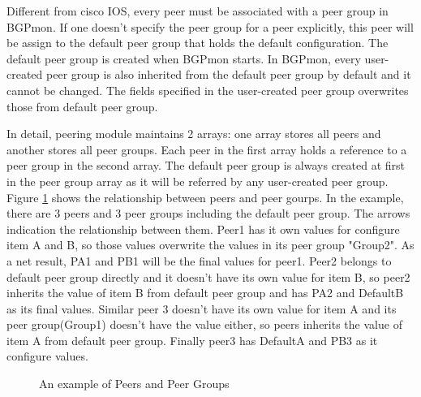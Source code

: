 Different from cisco IOS, every peer must be associated with a peer group in BGPmon. If one doesn't specify the peer group for a peer explicitly, this peer will be assign to the default peer group that holds the default configuration. The default peer group is created when BGPmon starts. In BGPmon, every user-created peer group is also inherited from the default peer group by default and it cannot be changed. The fields specified in the user-created peer group overwrites those from default peer group.

In detail, peering module maintains 2 arrays: one array stores all peers and another stores all peer groups. Each peer in the first array holds a reference to a peer group in the second array.  The default peer group is always created at first in the peer group array as it will be referred by any user-created peer group.  Figure \ref{fig:peerandpeergroup} shows the relationship between peers and peer gourps. In the example, there are 3 peers and 3 peer groups including the default peer group. The arrows indication the relationship between them. Peer1 has it own values for configure item A and B, so those values overwrite the values in its peer group "Group2". As a net result, PA1 and PB1 will be the final values for peer1. Peer2 belongs to default peer group directly and it doesn't have its own value for item B, so peer2 inherits the value of item B from default peer group and has PA2 and DefaultB as its final values. Similar peer 3 doesn't have its own value for item A and its peer group(Group1) doesn't have the value either, so peers inherits the value of item A from default peer group. Finally peer3 has DefaultA and PB3 as it configure values.

\begin{figure}[!htb]
\centering
{}
\caption{An example of Peers and Peer Groups}
\label{fig:peerandpeergroup}
\end{figure}

